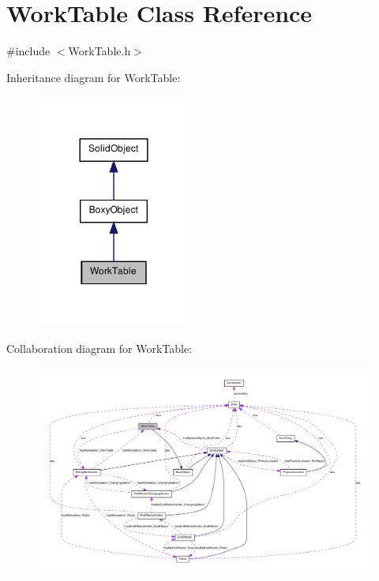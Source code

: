 \hypertarget{class_work_table}{
\section{WorkTable Class Reference}
\label{class_work_table}
}


{\ttfamily \#include $<$WorkTable.h$>$}



Inheritance diagram for WorkTable:\nopagebreak
\begin{figure}[H]
\begin{center}
\leavevmode
\includegraphics[width=144pt]{class_work_table__inherit__graph}
\end{center}
\end{figure}


Collaboration diagram for WorkTable:\nopagebreak
\begin{figure}[H]
\begin{center}
\leavevmode
\includegraphics[width=400pt]{class_work_table__coll__graph}
\end{center}
\end{figure}
